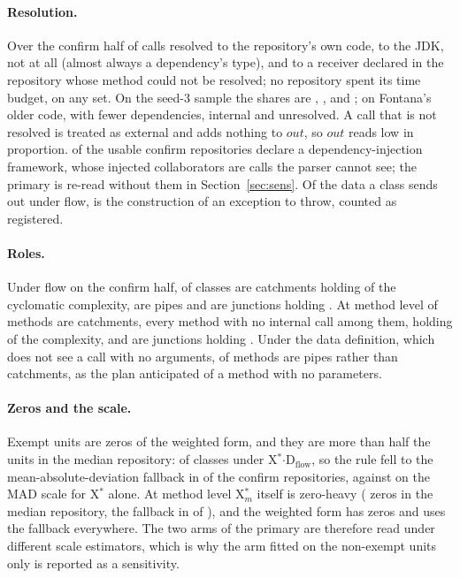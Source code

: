 \documentclass[11pt,a4paper]{article}
\newcommand{\Xs}{X$^*$}
\newcommand{\Xm}{X$^*_m$}
\newcommand{\Dflow}{D$_{\text{flow}}$}
\begin{document}
\paragraph{Resolution.} Over the confirm half \callsMlcqInternal{} of
calls resolved to the repository's own code, \callsMlcqJdk{} to the JDK,
\callsMlcqUnresolved{} not at all (almost always a dependency's type), and
\callsMlcqShouldHave{} to a receiver declared in the repository whose
method could not be resolved; no repository spent its time budget, on any
set. On the seed-3 sample the shares are \callsSeedThreeInternal{},
\callsSeedThreeJdk{}, \callsSeedThreeUnresolved{} and
\callsSeedThreeShouldHave{}; on Fontana's older code, with fewer
dependencies, \callsFontanaInternal{} internal and
\callsFontanaUnresolved{} unresolved. A call that is not resolved is
treated as external and adds nothing to $\mathit{out}$, so $\mathit{out}$
reads low in proportion. \diMlcqRepos{} of the \mlcqConfirmUsable{} usable
confirm repositories declare a dependency-injection framework, whose
injected collaborators are calls the parser cannot see; the primary is
re-read without them in Section~\ref{sec:sens}. Of the data a class sends
out under flow, \throwNewMlcqClassShare{} is the construction of an
exception to throw, counted as registered.

\paragraph{Roles.} Under flow on the confirm half, \roleMlcqClassCatchmentUnits{}
of classes are catchments holding \roleMlcqClassCatchmentCc{} of the
cyclomatic complexity, \roleMlcqClassPipeUnits{} are pipes and
\roleMlcqClassJunctionUnits{} are junctions holding
\roleMlcqClassJunctionCc{}. At method level \roleMlcqMethodCatchmentUnits{}
of methods are catchments, every method with no internal call among them,
holding \roleMlcqMethodCatchmentCc{} of the complexity, and
\roleMlcqMethodJunctionUnits{} are junctions holding
\roleMlcqMethodJunctionCc{}. Under the data definition, which does not see a
call with no arguments, \roleMlcqMethodDataPipeUnits{} of methods are pipes
rather than catchments, as the plan anticipated of a method with no
parameters.

\paragraph{Zeros and the scale.} Exempt units are zeros of the weighted
form, and they are more than half the units in the median repository:
\zeroMlcqDClass{} of classes under \Xs$\cdot$\Dflow{}, so the rule fell to
the mean-absolute-deviation fallback in \scaleMlcqDMeanAd{} of the
\scaleMlcqClassRepos{} confirm repositories, against \scaleMlcqXMad{} on the
MAD scale for \Xs{} alone. At method level \Xm{} itself is zero-heavy
(\zeroMlcqXm{} zeros in the median repository, the fallback in
\scaleMlcqXmMeanAd{} of \scaleMlcqMethodRepos{}), and the weighted form has
\zeroMlcqDmMethod{} zeros and uses the fallback everywhere. The two arms of
the primary are therefore read under different scale estimators, which is
why the arm fitted on the non-exempt units only is reported as a sensitivity.
\end{document}
